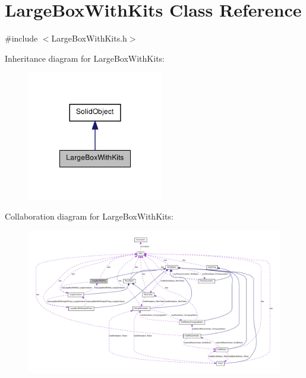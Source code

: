 \hypertarget{class_large_box_with_kits}{
\section{LargeBoxWithKits Class Reference}
\label{class_large_box_with_kits}
}


{\ttfamily \#include $<$LargeBoxWithKits.h$>$}



Inheritance diagram for LargeBoxWithKits:\nopagebreak
\begin{figure}[H]
\begin{center}
\leavevmode
\includegraphics[width=168pt]{class_large_box_with_kits__inherit__graph}
\end{center}
\end{figure}


Collaboration diagram for LargeBoxWithKits:\nopagebreak
\begin{figure}[H]
\begin{center}
\leavevmode
\includegraphics[width=400pt]{class_large_box_with_kits__coll__graph}
\end{center}
\end{figure}
